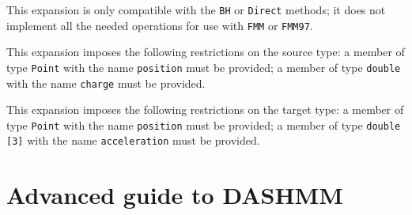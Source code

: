 \documentclass[11pt]{book}
\begin{document}
This expansion is only compatible with the {\tt BH} or {\tt Direct} methods; 
it does not implement all the needed operations for use with {\tt FMM} or 
{\tt FMM97}.

This expansion imposes the following restrictions on the source type: a
member of type {\tt Point} with the name {\tt position} must be provided; a
member of  type {\tt double} with the name {\tt charge} must be provided.

This expansion imposes the following restrictions on the target type: a
member of type {\tt Point} with the name {\tt position} must be provided; 
a member of
type {\tt double [3]} with the name {\tt acceleration} must be provided.


\chapter{Advanced guide to DASHMM} 
\end{document}
